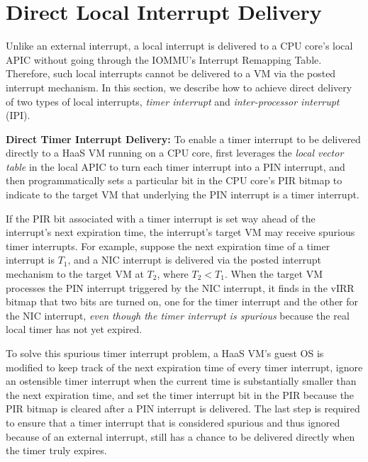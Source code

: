 \vspace{-0.1in}
\section{Direct Local Interrupt Delivery}
\vspace{-0.05in}
\label{sec:shared_pid_dtid}

Unlike an external interrupt, a local interrupt is delivered to a CPU core's local APIC without going through the IOMMU's Interrupt Remapping Table.
Therefore, such local interrupts cannot be delivered to a VM via the posted interrupt mechanism.
In this section, we describe how to achieve direct delivery of two types of local interrupts, {\em timer interrupt} and {\em inter-processor interrupt} (IPI).

{\bf Direct Timer Interrupt Delivery:} To enable a timer interrupt to be delivered directly to a HaaS VM running on a CPU core,
\na first leverages the {\em local vector table} in the local APIC to turn each timer interrupt into a PIN interrupt, and
then programmatically sets a particular bit in the CPU core's PIR bitmap to indicate to the target VM that underlying the PIN interrupt is a timer interrupt.

If the PIR bit associated with a timer interrupt is set way ahead of the interrupt's next expiration time,
the interrupt's target VM may receive spurious timer interrupts.
For example, suppose the next expiration time of a timer interrupt is $T_1$, and a NIC interrupt is delivered via the posted interrupt mechanism to the target VM at $T_2$, where ${T_2} < {T_1}$.
When the target  VM processes the PIN interrupt triggered by the NIC interrupt, it finds in the vIRR bitmap that two bits are turned on, one for the timer interrupt and the other for the NIC
interrupt, {\em even though the timer interrupt is spurious} because the real local timer has not yet expired.

To solve this spurious timer interrupt problem, a HaaS VM's guest OS is modified to keep track of the next expiration time of every timer interrupt, ignore an ostensible timer interrupt when
the current time is substantially smaller than the next expiration time,
and set the timer interrupt bit in the PIR because the PIR bitmap is cleared
after a PIN interrupt is delivered.
The last step is required to ensure that a timer interrupt that is considered spurious and thus ignored because of an external interrupt,  still has a chance to be delivered directly when the timer truly expires.

